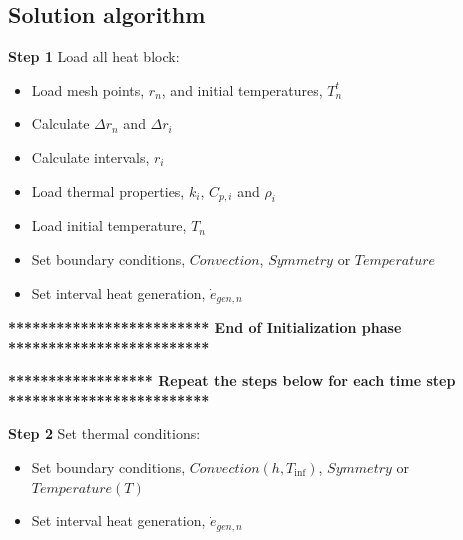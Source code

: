 \documentclass[11pt,letterpaper,titlepage]{article}
\begin{document}
\subsection{Solution algorithm}
\vspace{0.5cm}\noindent
\textbf{Step 1}\newline
Load all heat block:
\begin{itemize}
\item Load mesh points, $r_n$, and initial temperatures, $T_n^t$
\item Calculate $\Delta r_n$ and $\Delta r_i$
\item Calculate intervals, $r_i$
\item Load thermal properties, $k_i$, $C_{p,i}$ and $\rho_i$
\item Load initial temperature, $T_n$
\item Set boundary conditions, $Convection$, $Symmetry$ or $Temperature$
\item Set interval heat generation, $\dot{e}_{gen,n}$
\end{itemize}

\vspace{0.5cm}\noindent
\textbf{************************* End of Initialization phase *************************}\newline

\vspace{0.5cm}\noindent
\textbf{****************** Repeat the steps below for each time step *************************}\newline


\vspace{0.5cm}\noindent
\textbf{Step 2}\newline
Set thermal conditions:
\begin{itemize}
\item Set boundary conditions, $Convection(h,T_{\inf})$, $Symmetry$ or $Temperature(T)$
\item Set interval heat generation, $\dot{e}_{gen,n}$
\end{itemize}
\end{document}
